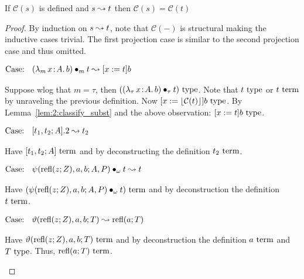 \begin{lemma}
    \label{lem:2:classify_preservation_step}
    If $\mathcal{C}(s)$ is defined and $s \leadsto t$ then $\mathcal{C}(s) = \mathcal{C}(t)$
\end{lemma}
\begin{proof}
    By induction on $s \leadsto t$, note that $\mathcal{C}(-)$ is structural making the inductive cases trivial.
    The first projection case is similar to the second projection case and thus omitted.

    $\text{Case: }\begin{array}{c} ({\lambda_m}\, x\! : \! A.\, b) \bullet_{m} t \leadsto [x := t]b \end{array}$
    \begin{proofcase}
        Suppose wlog that $m = \tau$, then $(({\lambda_\tau}\, x\! : \! A.\, b) \bullet_{\tau} t)~\textnormal{type}$.
        Note that $t~\textnormal{type}$ or $t~\textnormal{term}$ by unraveling the previous definition.
        Now $[x := \lfloor \mathcal{C}(t) \rfloor]b~\textnormal{type}$.
        By Lemma~\ref{lem:2:classify_subst} and the above observation: $[x := t]b~\textnormal{type}$.
    \end{proofcase}

    $\text{Case: }\begin{array}{c} [t_1, t_2; A].2 \leadsto t_2 \end{array}$
    \begin{proofcase}
        Have $[t_1, t_2; A]~\textnormal{term}$ and by deconstructing the definition $t_2~\textnormal{term}$.
    \end{proofcase}

    $\text{Case: }\begin{array}{c} \psi(\text{refl}(z; Z), a, b; A, P) \bullet_{\omega} t \leadsto t \end{array}$
    \begin{proofcase}
        Have $(\psi(\text{refl}(z; Z), a, b; A, P) \bullet_{\omega} t)~\textnormal{term}$ and by deconstruction the definition $t~\textnormal{term}$.
    \end{proofcase}

    $\text{Case: }\begin{array}{c} \vartheta(\text{refl}(z; Z), a, b; T) \leadsto \text{refl}(a; T) \end{array}$
    \begin{proofcase}
        Have $\vartheta(\text{refl}(z; Z), a, b; T)~\textnormal{term}$ and by deconstruction the definition $a~\textnormal{term}$ and $T~\textnormal{type}$.
        Thus, $\text{refl}(a; T)~\textnormal{term}$.
    \end{proofcase}
\end{proof}

